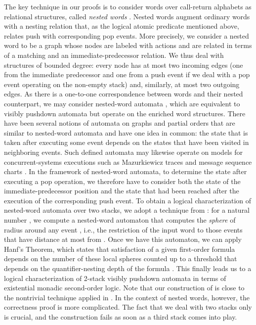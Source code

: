 \documentclass{LMCS}
\begin{document}
The key technique in our proofs is to consider words over call-return
alphabets as relational structures, called \emph{nested words} \cite{AlurM06}.
Nested words augment ordinary words with a nesting relation that, as the
logical atomic predicate mentioned above, relates push with corresponding pop
events. More precisely, we consider a nested word to be a graph whose nodes
are labeled with actions and are related in terms of a matching and an
immediate-predecessor relation. We thus deal with structures of bounded
degree: every node has at most two incoming edges (one from the immediate
predecessor and one from a push event if we deal with a pop event operating on
the non-empty stack) and, similarly, at most two outgoing edges. As there is a
one-to-one correspondence between words and their nested counterpart, we may
consider nested-word automata \cite{AlurM06}, which are equivalent to visibly
pushdown automata but operate on the enriched word structures. There have been
several notions of automata on graphs and partial orders
\cite{Tho-automata-ttp,ThoPOMIV96} that are similar to nested-word automata
and have one idea in common: the state that is taken after executing some
event depends on the states that have been visited in neighboring events. Such
defined automata may likewise operate on models for concurrent-systems
executions such as Mazurkiewicz traces \cite{Droste2000} and message sequence
charts \cite{BolligJournal}. In the framework of nested-word automata, to
determine the state after executing a pop operation, we therefore have to
consider both the state of the immediate-predecessor position and the state
that had been reached after the execution of the corresponding push event. To
obtain a logical characterization of nested-word automata over two stacks, we
adopt a technique from \cite{BolligJournal}: for a natural number , we
compute a nested-word automaton  that computes the \emph{sphere}
of radius  around any event , i.e., the restriction of the input
word to those events that have distance at most  from . Once we
have this automaton, we can apply Hanf's Theorem, which states that
satisfaction of a given first-order formula depends on the number of these
local spheres counted up to a threshold that depends on the quantifier-nesting
depth of the formula \cite{Hanf1965}. This finally leads us to a logical
characterization of 2-stack visibly pushdown automata in terms of existential
monadic second-order logic. Note that our construction of  is
close to the nontrivial technique applied in \cite{BolligJournal}. In the
context of nested words, however, the correctness proof is more complicated.
The fact that we deal with two stacks only is crucial, and the construction
fails as soon as a third stack comes into play.
\end{document}
